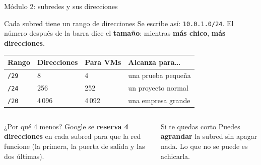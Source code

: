 \documentclass[aspectratio=169,10pt,c]{beamer}
\begin{document}
\begin{frame}{Módulo 2: subredes y sus direcciones}
\begin{block}{Cada subred tiene un rango de direcciones}
\small Se escribe así: \texttt{10.0.1.0/24}. El número después de la barra dice el \textbf{tamaño}: mientras \textbf{más chico}, \textbf{más direcciones}.
\end{block}
\renewcommand{\arraystretch}{1.3}
\centering\small
\begin{tabular}{@{}p{2.4cm}p{3.4cm}p{3.0cm}p{3.8cm}@{}}
\toprule
\textbf{Rango} & \textbf{Direcciones} & \textbf{Para VMs} & \textbf{Alcanza para\ldots}\\
\midrule
\texttt{/29} & 8 & 4 & una prueba pequeña\\
\texttt{/24} & 256 & 252 & un proyecto normal\\
\texttt{/20} & 4\,096 & 4\,092 & una empresa grande\\
\bottomrule
\end{tabular}
\par\vspace{3mm}
\begin{columns}[T,onlytextwidth]
\begin{exampleblock}{¿Por qué 4 menos?}
\small Google se \textbf{reserva 4 direcciones} en cada subred para que la red funcione (la primera, la puerta de salida y las dos últimas).
\end{exampleblock}
\begin{alertblock}{Si te quedas corto}
\small Puedes \textbf{agrandar} la subred sin apagar nada. Lo que no se puede es achicarla.
\end{alertblock}
\end{columns}
\end{frame}
\end{document}

